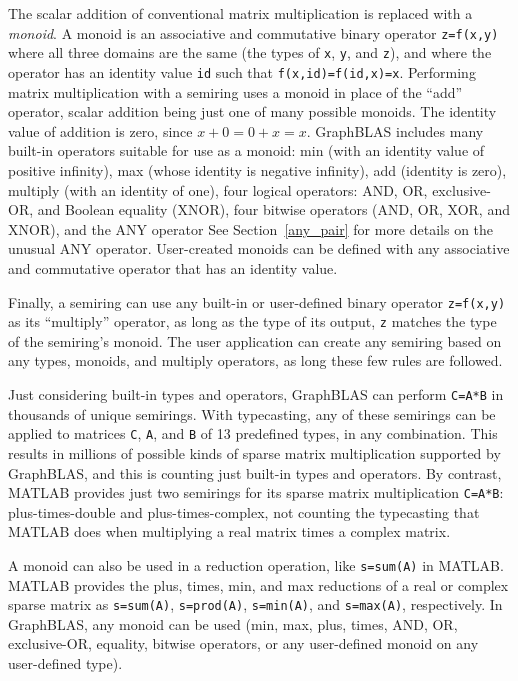 \documentclass[12pt]{article}
\begin{document}
The scalar addition of conventional matrix multiplication is replaced with a
{\em monoid}.  A monoid is an associative and commutative binary operator
\verb'z=f(x,y)' where all three domains are the same (the types of \verb'x',
\verb'y', and \verb'z'), and where the operator has an identity value \verb'id'
such that \verb'f(x,id)=f(id,x)=x'.  Performing matrix multiplication with a
semiring uses a monoid in place of the ``add'' operator, scalar addition being
just one of many possible monoids.  The identity value of addition is zero,
since $x+0=0+x=x$.   GraphBLAS includes many built-in operators suitable for
use as a monoid: min (with an identity value of positive infinity), max (whose
identity is negative infinity), add (identity is zero), multiply (with an
identity of one), four logical operators: AND, OR, exclusive-OR, and
Boolean equality (XNOR), four bitwise operators (AND, OR, XOR, and XNOR),
and the ANY operator
See Section~\ref{any_pair} for more details on the unusual ANY operator.
User-created monoids can be defined with any associative and
commutative operator that has an identity value.

Finally, a semiring can use any built-in or user-defined binary operator
\verb'z=f(x,y)' as its ``multiply'' operator, as long as the type of its
output, \verb'z' matches the type of the semiring's monoid.
The user application can create any semiring based on any types, monoids,
and multiply operators, as long these few rules are followed.

Just considering built-in types and operators, GraphBLAS can perform
\verb'C=A*B' in thousands of unique semirings.  With typecasting, any of these
semirings can be applied to matrices \verb'C', \verb'A', and \verb'B' of 13
predefined types, in any combination.  This results in millions of possible
kinds of sparse matrix multiplication supported by GraphBLAS, and this is
counting just built-in types and operators.  By contrast, MATLAB provides just
two semirings for its sparse matrix multiplication \verb'C=A*B':
plus-times-double and plus-times-complex, not counting the typecasting that
MATLAB does when multiplying a real matrix times a complex matrix.

A monoid can also be used in a reduction operation, like \verb's=sum(A)' in
MATLAB.  MATLAB provides the plus, times, min, and max reductions of a real or
complex sparse matrix as \verb's=sum(A)',  \verb's=prod(A)', \verb's=min(A)',
and \verb's=max(A)', respectively.  In GraphBLAS, any monoid can be used (min,
max, plus, times, AND, OR, exclusive-OR, equality, bitwise operators,
or any user-defined monoid on any user-defined type).
\end{document}
